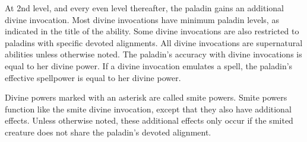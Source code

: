 At 2nd level, and every even level thereafter, the paladin gains an additional divine invocation.
Most divine invocations have minimum paladin levels, as indicated in the title of the ability.
Some divine invocations are also restricted to paladins with specific devoted alignments.
All divine invocations are supernatural abilities unless otherwise noted.
The paladin's accuracy with divine invocations is equal to her divine power.
If a divine invocation emulates a spell, the paladin's effective spellpower is equal to her divine power.

Divine powers marked with an asterisk are called smite powers.
Smite powers function like the smite divine invocation, except that they also have additional effects.
Unless otherwise noted, these additional effects only occur if the smited creature does not share the paladin's devoted alignment.


